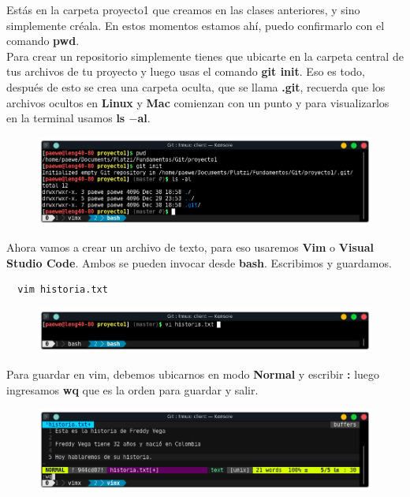 \documentclass{article}
\begin{document}
Estás en la carpeta proyecto1 que creamos en las clases anteriores, y sino
simplemente créala. En estos momentos estamos ahí, puedo confirmarlo con el
comando \textbf{pwd}.\\

Para crear un repositorio simplemente tienes que ubicarte en la carpeta central
de tus archivos de tu proyecto y luego usas el comando \textbf{git init}. Eso
es todo, después de esto se crea una carpeta oculta, que se llama
\textbf{.git}, recuerda que los archivos ocultos en \textbf{Linux} y
\textbf{Mac} comienzan con un punto y para visualizarlos en la terminal usamos
\textbf{ls $-$al}.

\begin{figure}[h!]
  \centering
  \includegraphics[scale=0.75]{./Pictures/070_init.png}
\end{figure}

Ahora vamos a crear un archivo de texto, para eso usaremos \textbf{Vim} o
\textbf{Visual Studio Code}. Ambos se pueden invocar desde \textbf{bash}.
Escribimos y guardamos.

\begin{verbatim}
  vim historia.txt
\end{verbatim}

\begin{figure}[h!]
  \centering
  \includegraphics[scale=0.75]{./Pictures/071_open_vim.png}
\end{figure}

Para guardar en vim, debemos ubicarnos en modo \textbf{Normal} y escribir
\textbf{:} luego ingresamos \textbf{wq} que es la orden para guardar y salir.

\begin{figure}[h!]
  \centering
  \includegraphics[scale=0.75]{./Pictures/071_vim_historia.png}
\end{figure}
\end{document}
